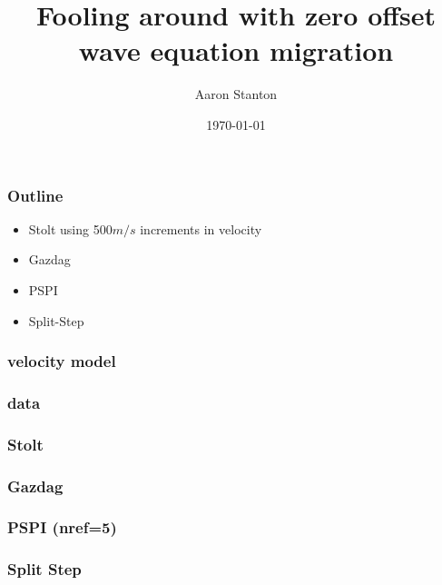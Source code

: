 \title[Short title]{Fooling around with zero offset wave equation migration}
\author{Aaron Stanton}
\date{\today}


\maketitle
{}
\begin{frame} \frametitle{Outline}
    \begin{itemize}
        \item Stolt using 500$m/s$ increments in velocity
        \item Gazdag
        \item PSPI
        \item Split-Step
    \end{itemize}
\end{frame}

\begin{frame} \frametitle{velocity model}
\end{frame}

\begin{frame} \frametitle{data}
\end{frame}

\begin{frame} \frametitle{Stolt}
\end{frame}
\begin{frame} \frametitle{Gazdag}
\end{frame}
\begin{frame} \frametitle{PSPI (nref=5)}
\end{frame}
\begin{frame} \frametitle{Split Step}
\end{frame}

